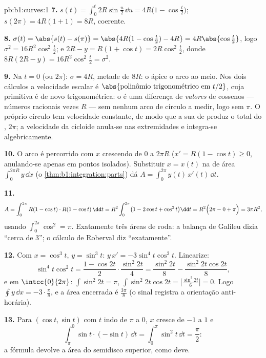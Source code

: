 \begin{solution}{pb:b1:curves:1}
\textbf{7.} $s(t) = \int_0^t 2R\sin\frac u2\,\dd u =
4R\bigl(1 - \cos\frac t2\bigr)$; $s(2\pi) = 4R(1+1) = 8R$, coerente.

\textbf{8.} $\sigma(t) = \abs{s(t) - s(\pi)} = \abs{4R(1 -
\cos\frac t2) - 4R} = 4R\abs{\cos\frac t2}$, logo $\sigma^2 =
16R^2\cos^2\frac t2$; e $2R - y = R(1 + \cos t) =
2R\cos^2\frac t2$, donde $8R(2R - y) = 16R^2\cos^2\frac t2 =
\sigma^2$.

\textbf{9.} Na  $t = 0$ (ou $2\pi$): $\sigma = 4R$, metade de $8R$: o
ápice  o arco ao meio. Nos dois cálculos a velocidade escalar é
$\abs{\text{polinômio trigonométrico em } t/2}$, cuja primitiva é de novo trigonométrica: o  é uma
diferença de \emph{valores} de cossenos --- números racionais vezes
$R$ --- sem nenhum arco de círculo a medir, logo sem $\pi$. O próprio
círculo tem velocidade constante, de modo que a sua  de
 produz o  total do , $2\pi$; a
velocidade da cicloide anula-se nas extremidades e integra-se
algebricamente.

\textbf{10.} O arco é percorrido com $x$ crescendo de $0$ a
$2\pi R$ ($x' = R(1 - \cos t) \geq 0$, anulando-se apenas em pontos isolados). Substituir
$x = x(t)$ na  de área $\int_0^{2\pi R} y\,\dd x$ (o \cref{thm:b1:integration:parts}) dá $A = \int_0^{2\pi} y(t)\,x'(t)\,\dd t$.

\textbf{11.}
\[
A = \int_0^{2\pi} R(1 - \cos t)\cdot R(1 - \cos t)\,\dd t
= R^2\int_0^{2\pi}\bigl(1 - 2\cos t + \cos^2 t\bigr)\dd t
= R^2\Bigl(2\pi - 0 + \pi\Bigr) = 3\pi R^2 ,
\]
usando $\int_0^{2\pi}\cos^2 = \pi$. Exatamente três áreas de roda: a balança de Galileu
dizia ``cerca de $3$''; o cálculo de Roberval diz ``exatamente''.

\textbf{12.} Com $x = \cos^3 t$, $y = \sin^3 t$: $y\,x' =
-3\sin^4 t\cos^2 t$. Linearize:
\[
\sin^4 t\cos^2 t = \frac{1 - \cos 2t}{2}\cdot\frac{\sin^2
2t}{4} = \frac{\sin^2 2t}{8} - \frac{\sin^2 2t\cos 2t}{8} ,
\]
e em $\intcc{0}{2\pi}$: $\int\sin^2 2t = \pi$, $\int \sin^2
2t\cos 2t = \bigl[\frac{\sin^3 2t}{6}\bigr] = 0$. Logo $\oint
y\,\dd x = -3\cdot\frac\pi8$, e a área encerrada é $\frac{3\pi}8$ (o
sinal registra a orientação anti-horária).

\textbf{13.} Para $(\cos t, \sin t)$ com $t$ indo de $\pi$ a $0$, $x$ cresce de
$-1$ a $1$ e
\[
\int_\pi^0 \sin t\cdot(-\sin t)\,\dd t
= \int_0^\pi \sin^2 t\,\dd t = \frac\pi2 :
\]
a fórmula devolve a área do semidisco superior, como deve.


\end{solution}
